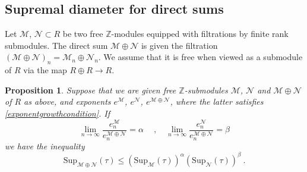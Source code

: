 \documentclass[a4paper,10pt]{amsart}
\newtheorem{prop}[thm]{Proposition}
\theoremstyle{definition}
\newtheorem{example}[thm]{Example}
\theoremstyle{remark}
\numberwithin{equation}{section}
\newcommand{\Z}{\mathbb Z}
\newcommand{\ts}{\mathrm{Sup}}
\newcommand{\rank}{\mathrm{rank}}
\newcommand{\0}{\color{blue}{\mathsf{0}}}
\begin{document}
 
     
     \subsection{Supremal diameter for direct sums}
     Let $\mathcal{M}$, $\mathcal{N} \subset R$ be two  free $\Z$-modules equipped with filtrations by finite rank submodules.  The direct sum 
    $\mathcal{M} \oplus \mathcal{N} $
     is given the  filtration $(\mathcal{M} \oplus \mathcal{N})_n=   \mathcal{M}_n \oplus \mathcal{N}_n$. We assume that it is  free when viewed as a submodule of $R$ via the map $R\oplus R \rightarrow R$. 
      
     
     \begin{prop} \label{prop: directsums}
     Suppose that we are given free $\Z$-submodules $\mathcal{M}$, $\mathcal{N}$ and $\mathcal{M} \oplus \mathcal{N}$  of $R$ as above, and exponents $e^{\mathcal{M}}$, $e^{\mathcal{N}}$, $e^{\mathcal{M}\oplus \mathcal{N}}$, where the latter satisfies \eqref{exponentgrowthcondition}. 
      If 
    \[  \lim_{n\rightarrow \infty} \frac{ e_n^{\mathcal{M}} }{ e_n^{\mathcal{M} \oplus \mathcal{N} } } =  \alpha \quad \  , \quad   \lim_{n\rightarrow \infty} \frac{ e_n^{\mathcal{N}} }{ e_n^{\mathcal{M} \oplus \mathcal{N}  }} = \beta   \]
     we have the inequality
   \[ \ts_{\mathcal{M} \oplus \mathcal{N}} (\tau) \leq \left(\ts_{\mathcal{M}}(\tau) \right)^{\alpha}    \left(\ts_{\mathcal{N}}(\tau)\right)^{\beta} \ . \]
     \end{prop} 
     
\end{document}
